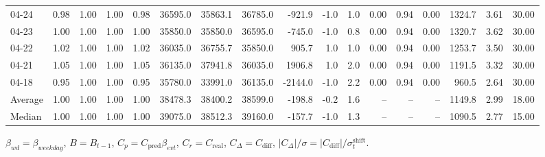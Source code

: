 \begin{threeparttable}
{\begin{tabular}{lrrrrrrrrrrrrrrrr}
  04-24 &         0.98 &           1.00 &          1.00 &          0.98 & 36595.0 & 35863.1 & 36785.0 &     -921.9 &                     -1.0 &                 1.0 &       0.00 &      0.94 &           0.00 &           1324.7 &            3.61 &                  30.00 \\
  04-23 &         1.00 &           1.00 &          1.00 &          1.00 & 35850.0 & 35850.0 & 36595.0 &     -745.0 &                     -1.0 &                 0.8 &       0.00 &      0.94 &           0.00 &           1320.7 &            3.62 &                  30.00 \\
  04-22 &         1.02 &           1.00 &          1.00 &          1.02 & 36035.0 & 36755.7 & 35850.0 &      905.7 &                      1.0 &                 1.0 &       0.00 &      0.94 &           0.00 &           1253.7 &            3.50 &                  30.00 \\
  04-21 &         1.05 &           1.00 &          1.00 &          1.05 & 36135.0 & 37941.8 & 36035.0 &     1906.8 &                      1.0 &                 2.0 &       0.00 &      0.94 &           0.00 &           1191.5 &            3.32 &                  30.00 \\
  04-18 &         0.95 &           1.00 &          1.00 &          0.95 & 35780.0 & 33991.0 & 36135.0 &    -2144.0 &                     -1.0 &                 2.2 &       0.00 &      0.94 &           0.00 &            960.5 &            2.64 &                  30.00 \\
Average &         1.00 &           1.00 &          1.00 &          1.00 & 38478.3 & 38400.2 & 38599.0 &     -198.8 &                     -0.2 &                 1.6 &         -- &        -- &             -- &           1149.8 &            2.99 &                  18.00 \\
 Median &         1.00 &           1.00 &          1.00 &          1.00 & 39075.0 & 38512.3 & 39160.0 &     -157.7 &                     -1.0 &                 1.3 &         -- &        -- &             -- &           1090.5 &            2.77 &                  15.00 \\
\bottomrule
\end{tabular}
}
\begin{tablenotes}\footnotesize
\item $\beta_{wd}=\beta_{weekday}$, $B=B_{t-1}$,
$C_p=C_{\text{pred}}\beta_{evt}$, $C_r=C_{\text{real}}$,
$C_\Delta=C_{\text{diff}}$, $|C_\Delta|/\sigma=|C_{\text{diff}}|/\sigma_t^{\text{shift}}$.
\end{tablenotes}
\end{threeparttable}
\endgroup
